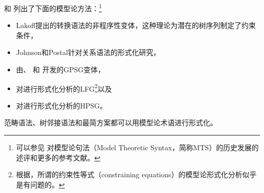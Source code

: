  \citet[--20]{PS2001a}和 \citet{Pullum2007a}列出了下面的模型论方法：\footnote{%
可以参见 对模型论句法（Model Theoretic Syntax，简称MTS）的历史发展的述评和更多的参考文献。  
}
\begin{itemize}
\item Lakoff提出的转换语法的非程序性变体，这种理论为潜在的树序列制定了约束条件，
\item Johnson和Postal针对关系语法的形式化研究\citeyearpar{JP80a-u}，
\item 由\citet{GPCKHL88a}、 \citet{BGM93a-u}和 \citet{Rogers97a}开发的GPSG变体\indexgpsg，
\item  对\citet{Kaplan95a}进行形式化分析的LFG\indexlfg \footnote{%
 根据\citet[\S~3.2]{Pullum2013a}，所谓的约束性等式（constraining equations）的模型论形式化分析似乎是有问题的。
}以及
\item  对\citet{King99a-u}进行形式化分析的HPSG\indexhpsg 。
\end{itemize}
范畴语法\indexcg\citep{BvN94a-u}、树邻接语法\indextag\citep{RVS94a-u}和最简方案\indexmp\citep{Veenstra98a}都可以用模型论术语进行形式化。

